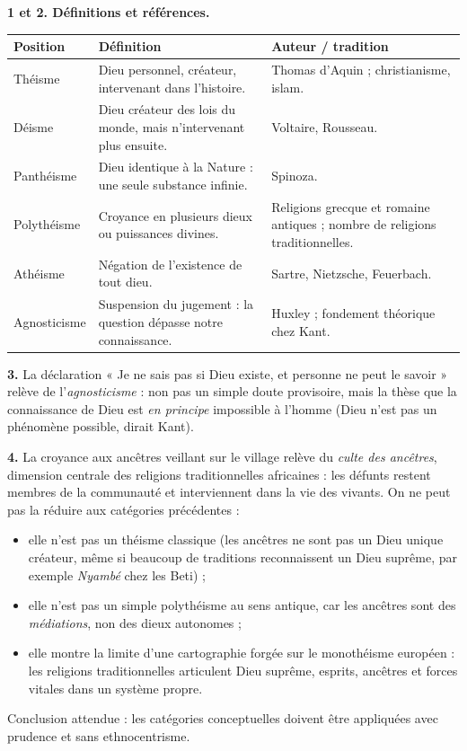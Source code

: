 \documentclass[11pt]{article}
\begin{document}
\begin{corrige}

\textbf{1 et 2. Définitions et références.}

\begin{center}
\begin{tabularx}{\linewidth}{|l|X|X|}
\hline
\rowcolor{popblueL} \textbf{Position} & \textbf{Définition} & \textbf{Auteur / tradition} \\
\hline
Théisme & Dieu personnel, créateur, intervenant dans l'histoire. & Thomas d'Aquin ; christianisme, islam. \\
\hline
Déisme & Dieu créateur des lois du monde, mais n'intervenant plus ensuite. & Voltaire, Rousseau. \\
\hline
Panthéisme & Dieu identique à la Nature : une seule substance infinie. & Spinoza. \\
\hline
Polythéisme & Croyance en plusieurs dieux ou puissances divines. & Religions grecque et romaine antiques ; nombre de religions traditionnelles. \\
\hline
Athéisme & Négation de l'existence de tout dieu. & Sartre, Nietzsche, Feuerbach. \\
\hline
Agnosticisme & Suspension du jugement : la question dépasse notre connaissance. & Huxley ; fondement théorique chez Kant. \\
\hline
\end{tabularx}
\end{center}

\textbf{3.} La déclaration « Je ne sais pas si Dieu existe, et personne ne peut le savoir » relève de l'\emph{agnosticisme} : non pas un simple doute provisoire, mais la thèse que la connaissance de Dieu est \emph{en principe} impossible à l'homme (Dieu n'est pas un phénomène possible, dirait Kant).

\textbf{4.} La croyance aux ancêtres veillant sur le village relève du \emph{culte des ancêtres}, dimension centrale des religions traditionnelles africaines : les défunts restent membres de la communauté et interviennent dans la vie des vivants. On ne peut pas la réduire aux catégories précédentes :
\begin{itemize}
\item elle n'est pas un théisme classique (les ancêtres ne sont pas un Dieu unique créateur, même si beaucoup de traditions reconnaissent un Dieu suprême, par exemple \emph{Nyambé} chez les Beti) ;
\item elle n'est pas un simple polythéisme au sens antique, car les ancêtres sont des \emph{médiations}, non des dieux autonomes ;
\item elle montre la limite d'une cartographie forgée sur le monothéisme européen : les religions traditionnelles articulent Dieu suprême, esprits, ancêtres et forces vitales dans un système propre.
\end{itemize}
Conclusion attendue : les catégories conceptuelles doivent être appliquées avec prudence et sans ethnocentrisme.
\end{corrige}
\end{document}
